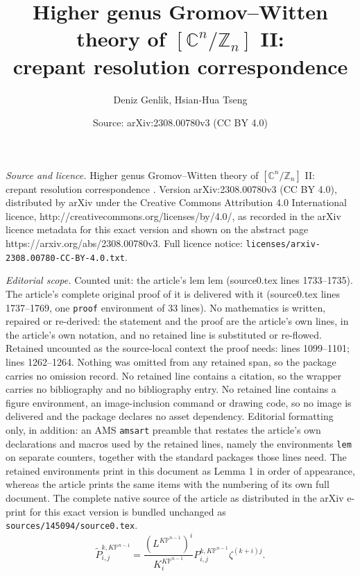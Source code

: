 \documentclass[10pt,a4paper]{amsart}
\title{Higher genus Gromov--Witten theory of $[\mathbb{C}^n/\mathbb{Z}_n]$ II:\\ { }crepant resolution correspondence \hfill}
\author{Deniz Genlik, Hsian-Hua Tseng}
\date{Source: arXiv:2308.00780v3 (CC BY 4.0)}
\newcommand{\KP}{K\mathbb{P}}
\begin{document}
\maketitle

\noindent\emph{Source and licence.} Higher genus Gromov--Witten theory of $[\mathbb{C}^n/\mathbb{Z}_n]$ II:\\ { }crepant resolution correspondence \hfill. Version arXiv:2308.00780v3 (CC BY 4.0), distributed by arXiv under the Creative Commons Attribution 4.0 International licence, http://creativecommons.org/licenses/by/4.0/, as recorded in the arXiv licence metadata for this exact version and shown on the abstract page https://arxiv.org/abs/2308.00780v3. Full licence notice: \texttt{licenses/arxiv-2308.00780-CC-BY-4.0.txt}.\par\smallskip

\noindent\textit{Editorial scope.} Counted unit: the article's lem lem (source0.tex lines 1733--1735). The article's complete original proof of it is delivered with it (source0.tex lines 1737--1769, one \texttt{proof} environment of 33 lines). No mathematics is written, repaired or re-derived: the statement and the proof are the article's own lines, in the article's own notation, and no retained line is substituted or re-flowed.  Retained uncounted as the source-local context the proof needs: lines 1099--1101; lines 1262--1264.  Nothing was omitted from any retained span, so the package carries no omission record.  No retained line contains a citation, so the wrapper carries no bibliography and no bibliography entry.  No retained line contains a figure environment, an image-inclusion command or drawing code, so no image is delivered and the package declares no asset dependency.  Editorial formatting only, in addition: an AMS \texttt{amsart} preamble that restates the article's own declarations and macros used by the retained lines, namely the environments \texttt{lem} on separate counters, together with the standard packages those lines need.  The retained environments print in this document as Lemma 1 in order of appearance, whereas the article prints the same items with the numbering of its own full document.  The complete native source of the article as distributed in the arXiv e-print for this exact version is bundled unchanged as \texttt{sources/145094/source0.tex}.
\begin{equation}\label{eqn:Flat_to_modflat_KP_2}
\widetilde{P}_{i,j}^{k,\KP^{n-1}}=\frac{(L^{\KP^{n-1}})^i}{K^{\KP^{n-1}}_i}P_{i,j}^{k,\KP^{n-1}}\zeta^{(k+i)j}.
\end{equation}
\end{document}
